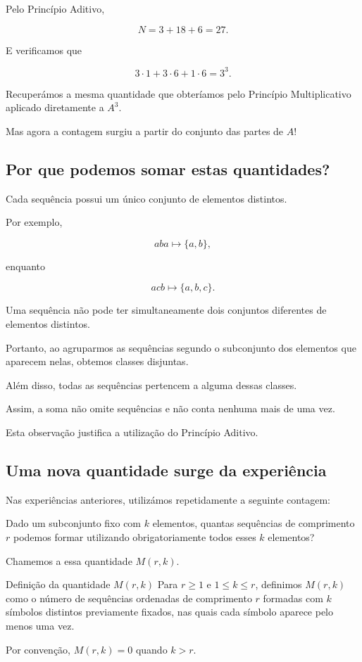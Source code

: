 \documentclass[11pt,a4paper,oneside]{book}
\begin{document}
Pelo Princípio Aditivo,

\[
N=3+18+6=27.
\]

E verificamos que

\[
3\cdot1+3\cdot6+1\cdot6=3^3.
\]

Recuperámos a mesma quantidade que obteríamos
pelo Princípio Multiplicativo aplicado diretamente
a $A^3$.

Mas agora a contagem surgiu a partir do
conjunto das partes de $A$!

\subsection*{Por que podemos somar estas quantidades?}

Cada sequência possui um único conjunto de
elementos distintos.

Por exemplo,

\[
aba\longmapsto\{a,b\},
\]

enquanto

\[
acb\longmapsto\{a,b,c\}.
\]

Uma sequência não pode ter simultaneamente
dois conjuntos diferentes de elementos distintos.

Portanto, ao agruparmos as sequências segundo
o subconjunto dos elementos que aparecem nelas,
obtemos classes disjuntas.

Além disso, todas as sequências pertencem
a alguma dessas classes.

Assim, a soma não omite sequências e não conta
nenhuma mais de uma vez.

Esta observação justifica a utilização do
Princípio Aditivo.

\subsection*{Uma nova quantidade surge da experiência}

Nas experiências anteriores, utilizámos
repetidamente a seguinte contagem:

Dado um subconjunto fixo com $k$ elementos,
quantas sequências de comprimento $r$
podemos formar utilizando obrigatoriamente
todos esses $k$ elementos?

Chamemos a essa quantidade $M(r,k)$.

\begin{teoremabox}{Definição da quantidade $M(r,k)$}
Para $r\geq1$ e $1\leq k\leq r$,
definimos $M(r,k)$ como o número de sequências
ordenadas de comprimento $r$ formadas com
$k$ símbolos distintos previamente fixados,
nas quais cada símbolo aparece pelo menos uma vez.

Por convenção, $M(r,k)=0$ quando $k>r$.
\end{teoremabox}
\end{document}
